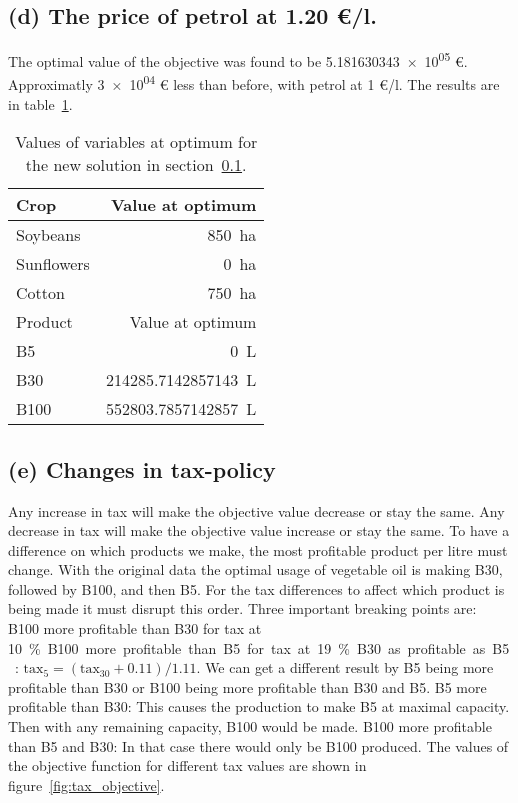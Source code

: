 \documentclass{article}
\begin{document}
\subsection{(d) The price of petrol at 1.20 \euro/l.}\label{sec:3d}
The optimal value of the objective was found to be
\num{5.181630343e+05} \euro. 
Approximatly \num{3e+04} \euro{} less than before, with petrol at 1 \euro/l.
The results are in table~\ref{tab:new_values}.

\begin{table}
	\centering
	\caption{Values of variables at optimum for the new solution in section~\ref{sec:3d}. \label{tab:new_values}}
	\begin{tabular}{l r}
		\toprule
		Crop       & Value at optimum               \\
		\midrule
		Soybeans   & \SI{850}{\hectare}             \\
		Sunflowers & \SI{0}{\hectare}               \\
		Cotton     & \SI{750}{\hectare}             \\
		\bottomrule
		\toprule
		Product    & Value at optimum               \\
		\midrule
		B5         & \SI{0}{\liter}                 \\
		B30        & \SI{214285.7142857143}{\liter} \\
		B100       & \SI{552803.7857142857}{\liter} \\
		\bottomrule
	\end{tabular}
\end{table}

\subsection{(e) Changes in tax-policy}
Any increase in tax will make the objective value decrease or stay the same. 
Any decrease in tax will make the objective value increase or stay the same. 
To have a difference on which products we make, the most profitable product per litre must change. 
With the original data the optimal usage of vegetable oil is making B30, followed by B100, and then B5. 
For the tax differences to affect which product is being made it must disrupt this order. 
Three important breaking points are: 
B100 more profitable than B30 for tax at \SI{10}\percent. 
B100 more profitable than B5 for tax at \SI{19}\percent. 
B30 as profitable as B5: $\textrm{tax}_5 = (\textrm{tax}_{30} + 0.11)/1.11$.
We can get a different result by B5 being more profitable than B30 or B100 being more profitable than B30 and B5. 
B5 more profitable than B30: This causes the production to make B5 at maximal capacity.  
Then with any remaining capacity, B100 would be made. 
B100 more profitable than B5 and B30: In that case there would only be B100 produced. 
The values of the objective function for different tax values
are shown in figure~\ref{fig:tax_objective}.
\end{document}
